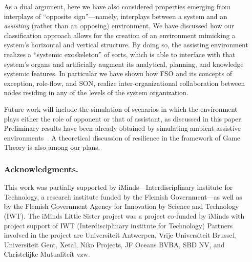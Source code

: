 \documentclass[twocolumn]{svjour3}
\begin{document}
As a dual argument, here we have also considered properties emerging from
interplays of ``opposite sign''---namely, interplays between a system and an \emph{assisting\/}
(rather than an opposing) environment. We have discussed how our classification approach allows
for the creation of an environment mimicking a system's horizontal and vertical structure.
By doing so, the assisting environment realizes a ``systemic exoskeleton'' of sorts,
which is able to interface with that system's organs and artificially augment its
analytical, planning, and knowledge systemic features. In particular we have shown
how FSO and its concepts of exception, role-flow, and SON, realize inter-organizational
collaboration between nodes residing in any of the levels of the system organization.

Future work will include the simulation of scenarios
in which the environment plays either the role of opponent or that
of assistant, as  
discussed in this paper.
Preliminary results have been already obtained by simulating ambient assistive
environments~\cite{DeFPa15a,DBLP:journals/corr/FlorioP15b}. A theoretical discussion of resilience in the
framework of Game Theory is also among our plans.


\subsubsection*{Acknowledgments.}
This work was partially supported by
iMinds---Interdisci\-pli\-nary institute for Technology, a research institute
funded by the Flemish Government---as well as by the Flemish Government Agency for Innovation by
Science and Technology (IWT).
The iMinds Little Sister project was a project co-funded by iMinds with project support of IWT
(Interdisciplinary institute for Technology)
Partners
involved in the project are
Universiteit Antwerpen,
Vrije Universiteit Brussel,
Universiteit Gent,
Xetal,
Niko Projects,
JF Oceans BVBA,
SBD NV,
and Christelijke Mutualiteit vzw.



\end{document}
